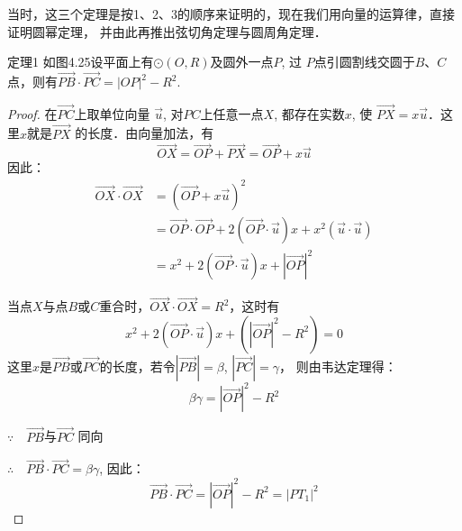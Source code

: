 当时，这三个定理是按1、2、3的顺序来证明的，现在我们用向量的运算律，直接证明圆幂定理，
并由此再推出弦切角定理与圆周角定理．

\begin{blk}{定理1}
    如图4.25设平面上有$\odot (O,R)$及圆外一点$P$, 过
$P$点引圆割线交圆于$B$、$C$点，则有$\Vec{PB}\cdot \Vec{PC}=|OP|^2-R^2$.
\end{blk}

\begin{figure}[htp]
    \centering
{}   
    \caption{}
\end{figure}


\begin{proof}
    在$\Vec{PC}$上取单位向量
$\vec{u}$, 对$PC$上任意一点$X$, 都存在实数$x$, 使
$\Vec{PX}=x\vec{u}$．这里$x$就是$\Vec{PX}$
的长度．由向量加法，有
\[\Vec{OX}=\Vec{OP}+\Vec{PX}=\Vec{OP}+x\vec{u}\]
因此：
\[\begin{split}
    \Vec{OX}\cdot \Vec{OX}&=\left(\Vec{OP}+x\vec{u}\right)^2\\
    &=\Vec{OP}\cdot \Vec{OP}+2\left(\Vec{OP}\cdot \vec{u}\right)x+x^2(\vec{u}\cdot \vec{u})\\
    &=x^2+2\left(\Vec{OP}\cdot \vec{u}\right)x+|\Vec{OP}|^2
\end{split}\]

当点$X$与点$B$或$C$重合时，$\Vec{OX}\cdot \Vec{OX}=R^2$，这时有
\[x^2+2\left(\Vec{OP}\cdot \vec{u}\right)x+\left(|\Vec{OP}|^2-R^2\right)=0\]
这里$x$是$\Vec{PB}$或$\Vec{PC}$的长度，若令$|\Vec{PB}|=\beta$,
 $|\Vec{PC}|=\gamma$，
则由韦达定理得：
\[\beta\gamma=|\Vec{OP}|^2-R^2\]

$\because\quad \Vec{PB}$与$\Vec{PC}$
同向

$\therefore\quad \Vec{PB}\cdot \Vec{PC}=\beta\gamma$, 因此：
\[\Vec{PB}\cdot \Vec{PC}=|\Vec{OP}|^2-R^2=|PT_1|^2\]
\end{proof}

